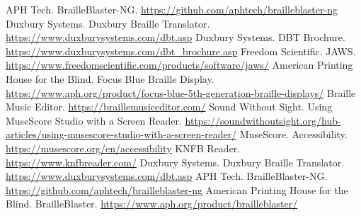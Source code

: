 \begin{thebibliography}{99}
 APH Tech. BrailleBlaster-NG. \url{https://github.com/aphtech/brailleblaster-ng}
 Duxbury Systems. Duxbury Braille Translator. \url{https://www.duxburysystems.com/dbt.asp}
 Duxbury Systems. DBT Brochure. \url{https://www.duxburysystems.com/dbt_brochure.asp}
 Freedom Scientific. JAWS. \url{https://www.freedomscientific.com/products/software/jaws/}
 American Printing House for the Blind. Focus Blue Braille Display. \url{https://www.aph.org/product/focus-blue-5th-generation-braille-displays/}
 Braille Music Editor. \url{https://braillemusiceditor.com/}
 Sound Without Sight. Using MuseScore Studio with a Screen Reader. \url{https://soundwithoutsight.org/hub-articles/using-musescore-studio-with-a-screen-reader/}
 MuseScore. Accessibility. \url{https://musescore.org/en/accessibility}
 KNFB Reader. \url{https://www.knfbreader.com/}
 Duxbury Systems. Duxbury Braille Translator. \url{https://www.duxburysystems.com/dbt.asp}
 APH Tech. BrailleBlaster-NG. \url{https://github.com/aphtech/brailleblaster-ng}
 American Printing House for the Blind. BrailleBlaster. \url{https://www.aph.org/product/brailleblaster/}
\end{thebibliography}
